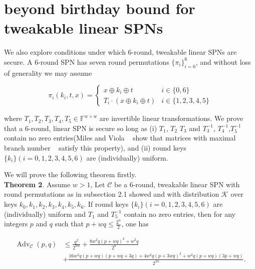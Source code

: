 

\section{beyond birthday bound for tweakable linear SPNs}
\label{section:beyond birthday bound for tweakable linear SPNs}

We also explore conditions under which 6-round, tweakable linear SPNs are secure. A 6-round SPN has seven round permutations $\{\pi_i\}_{i=0}^6$, and without loss of generality we may assume

$$
\pi_{i}\left(k_{i}, t, x\right)=\left\{\begin{array}{ll}
{x \oplus k_{i} \oplus t} & {i \in\{0,6\}} \\
{T_{i} \cdot\left(x \oplus k_{i} \oplus t \right)} & {i \in\{1,2,3,4,5\}}
\end{array}\right.
$$

where $T_{1}, T_{2}, T_{3}, T_{4}, T_{5}\in \mathbb{F}^{w \times w}$ are invertible linear transformations. We prove that a 6-round, linear SPN is secure so long as (i) $T_1$, $T_2$ $T_3$ and $T_{3}^{-1}$, $T_{4}^{-1}$,$T_{5}^{-1}$ contain no zero entries(Miles and Viola ~\cite{miles2015substitution} show that matrices with maximal branch number ~\cite{daemen1995cipher} satisfy this property), and (ii) round keys $\{k_i\}(i=0, 1, 2, 3, 4, 5, 6)$ are (individually) uniform.

We will prove the following theorem firstly.\\

\noindent
\textbf{Theorem 2}. Assume $w>1$, Let $\mathcal{C}$ be a 6-round, tweakable linear SPN with round permutations as in subsection 2.1 showed and with distribution $\mathcal{K}$ over keys $k_{0}, k_{1}, k_{2}, k_{3}, k_{4}, k_{5}, k_{6}$. If round keys $\{k_i\}(i=0, 1, 2, 3, 4, 5, 6)$ are (individually) uniform and $T_1$ and $T_{5}^{-1}$ contain no zero entries, then for any integers $\mathit{p}$ and $\mathit{q}$ such that $p+wq \leq \frac{2^n}{2}$, one has

\begin{equation}
\begin{aligned}
\operatorname{Adv}_{\mathcal{C}}\left(p, q\right) &\leq \frac{q^2}{2^{n w}} + \frac{8 w^2 q(p+wq)^2+w^2 q}{2^n}\\
&+ \frac{16 w^2 q(p+w q)(p+w q +3 q)+4 w^2 q(p+3 wq)^2+ w^2q(p+w q)(3p+w q)}{2^{2 n}}.
\end{aligned}
\end{equation}


